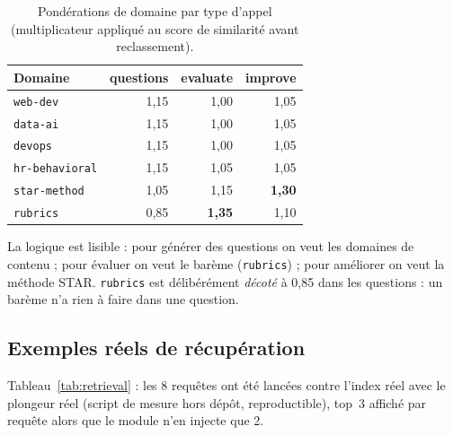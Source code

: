 \begin{small}
\begin{table}[H]
\centering
\caption{Pondérations de domaine par type d'appel (multiplicateur appliqué au score de
similarité avant reclassement).}
\label{tab:domainpriority}
\begin{tabular}{@{}l rrr@{}}
\toprule
\textbf{Domaine} & \textbf{questions} & \textbf{evaluate} & \textbf{improve} \\
\midrule
\texttt{web-dev}       & 1,15 & 1,00 & 1,05 \\
\texttt{data-ai}       & 1,15 & 1,00 & 1,05 \\
\texttt{devops}        & 1,15 & 1,00 & 1,05 \\
\texttt{hr-behavioral} & 1,15 & 1,05 & 1,05 \\
\texttt{star-method}   & 1,05 & 1,15 & \textbf{1,30} \\
\texttt{rubrics}       & 0,85 & \textbf{1,35} & 1,10 \\
\bottomrule
\end{tabular}
\end{table}
\end{small}

La logique est lisible : pour générer des questions on veut les domaines de
contenu ; pour évaluer on veut le barème (\texttt{rubrics}) ; pour améliorer on
veut la méthode STAR. \texttt{rubrics} est délibérément \emph{décoté} à 0,85
dans les questions : un barème n'a rien à faire dans une question.

\subsection{Exemples réels de récupération}
\label{sec:rag-exemples}

Tableau~\ref{tab:retrieval} : les 8 requêtes ont été lancées contre l'index
réel avec le plongeur réel (script de mesure hors dépôt, reproductible), top~3
affiché par requête alors que le module n'en injecte que 2.

